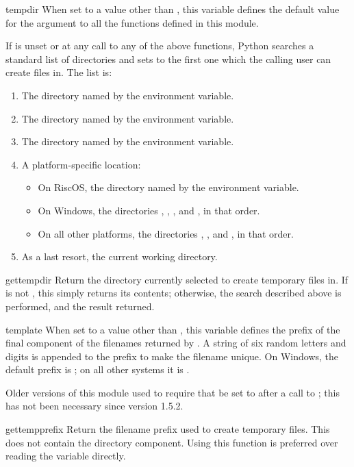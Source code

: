 \begin{datadesc}{tempdir}
When set to a value other than , this variable defines the
default value for the  argument to all the functions defined
in this module.

If  is unset or  at any call to any of the
above functions, Python searches a standard list of directories and
sets  to the first one which the calling user can create
files in.  The list is:

\begin{enumerate}
\item The directory named by the  environment variable.
\item The directory named by the  environment variable.
\item The directory named by the  environment variable.
\item A platform-specific location:
    \begin{itemize}
    \item On RiscOS, the directory named by the
           environment variable.
    \item On Windows, the directories
          ,
          ,
          , and
          , in that order.
    \item On all other platforms, the directories
          , , and , in that order.
    \end{itemize}
\item As a last resort, the current working directory.
\end{enumerate}
\end{datadesc}

\begin{funcdesc}{gettempdir}{}
Return the directory currently selected to create temporary files in.
If  is not , this simply returns its contents;
otherwise, the search described above is performed, and the result
returned.
\end{funcdesc}

\begin{datadesc}{template}
When set to a value other than , this variable defines the
prefix of the final component of the filenames returned by
.  A string of six random letters and digits is
appended to the prefix to make the filename unique.  On Windows,
the default prefix is ; on all other systems
it is .

Older versions of this module used to require that  be
set to  after a call to ; this has not
been necessary since version 1.5.2.
\end{datadesc}

\begin{funcdesc}{gettempprefix}{}
Return the filename prefix used to create temporary files.  This does
not contain the directory component.  Using this function is preferred
over reading the  variable directly.
\end{funcdesc}
